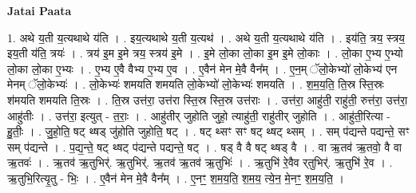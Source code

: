 \documentclass[17pt]{extarticle}
\begin{document}
\textbf{Jatai Paata} \newline

1. अथे य॒ती य॒त्यथाथे य॑ति । . इय॒त्यथाथे य॒ती य॒त्यथ॑ । . अथे य॒ती य॒त्यथाथे य॑ति । . इय॑ति॒ त्रय॒ स्त्रय॒ इय॒ती य॑ति॒ त्रयः॑ । . त्रय॑ इ॒म इ॒मे त्रय॒ स्त्रय॑ इ॒मे । . इ॒मे लो॒का लो॒का इ॒म इ॒मे लो॒काः । . लो॒का ए॒भ्य ए॒भ्यो लो॒का लो॒का ए॒भ्यः । . ए॒भ्य ए॒वै वैभ्य ए॒भ्य ए॒व । . ए॒वैन॑ मेन मे॒वै वैन᳚म् । . ए॒न॒म् ॅलो॒केभ्यो॑ लो॒केभ्य॑ एन मेनम् ॅलो॒केभ्यः॑ । . लो॒केभ्यः॑ शमयति शमयति लो॒केभ्यो॑ लो॒केभ्यः॑ शमयति । . श॒म॒य॒ति॒ ति॒स्र स्ति॒स्रः श॑मयति शमयति ति॒स्रः । . ति॒स्र उत्त॑रा॒ उत्त॑रा स्ति॒स्र स्ति॒स्र उत्त॑राः । . उत्त॑रा॒ आहु॑ती॒ राहु॑ती॒ रुत्त॑रा॒ उत्त॑रा॒ आहु॑तीः । . उत्त॑रा॒ इत्युत् - त॒राः॒ । . आहु॑तीर् जुहोति जुहो॒ त्याहु॑ती॒ राहु॑तीर् जुहोति । . आहु॑ती॒रित्या - हु॒तीः॒ । . जु॒हो॒ति॒ षट् थ्षड् जु॑होति जुहोति॒ षट् । . षट् थ्सꣳ सꣳ षट् थ्षट् थ्सम् । . सम् प॑द्यन्ते पद्यन्ते॒ सꣳ सम् प॑द्यन्ते । . प॒द्य॒न्ते॒ षट् थ्षट् प॑द्यन्ते पद्यन्ते॒ षट् । . षड् वै वै षट् थ्षड् वै । . वा ऋ॒तव॑ ऋ॒तवो॒ वै वा ऋ॒तवः॑ । . ऋ॒तव॑ ऋ॒तुभिर्॑. ऋ॒तुभिर्॑. ऋ॒तव॑ ऋ॒तव॑ ऋ॒तुभिः॑ । . ऋ॒तुभि॑ रे॒वैव र्‌तुभिर्॑. ऋ॒तुभि॑ रे॒व । . ऋ॒तुभि॒रित्यृ॒तु - भिः॒ । . ए॒वैन॑ मेन मे॒वै वैन᳚म् । . ए॒नꣳ॒॒ श॒म॒य॒ति॒ श॒म॒य॒ त्ये॒न॒ मे॒नꣳ॒॒ श॒म॒य॒ति॒ । \newline
\end{document}
